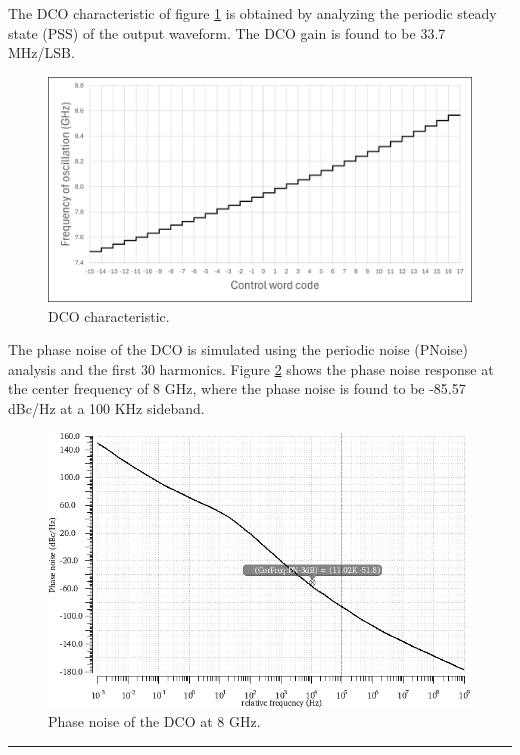 The DCO characteristic of figure \ref{fig:DCO_characteristic} is obtained by analyzing the periodic steady state (PSS) of the output waveform. The DCO gain is found to be 33.7 MHz/LSB.

\begin{figure}[H]
    \centering
    \includegraphics[width=1\textwidth]{figures/DCO_characteristic.png}
    \caption{DCO characteristic.}
    \label{fig:DCO_characteristic}
\end{figure}

The phase noise of the DCO is simulated using the periodic noise (PNoise) analysis and the first 30 harmonics. Figure \ref{fig:DCO_phase_noise} shows the
phase noise response at the center frequency of 8 GHz, where the phase noise is found to be -85.57 dBc/Hz at a 100 KHz sideband.

\begin{figure}[H]
    \centering
    \includegraphics[width=1\textwidth]{figures/DCO_phase_noise.png}
    \caption{Phase noise of the DCO at 8 GHz.}
    \label{fig:DCO_phase_noise}
\end{figure}

\noindent\rule{\textwidth}{1pt}
